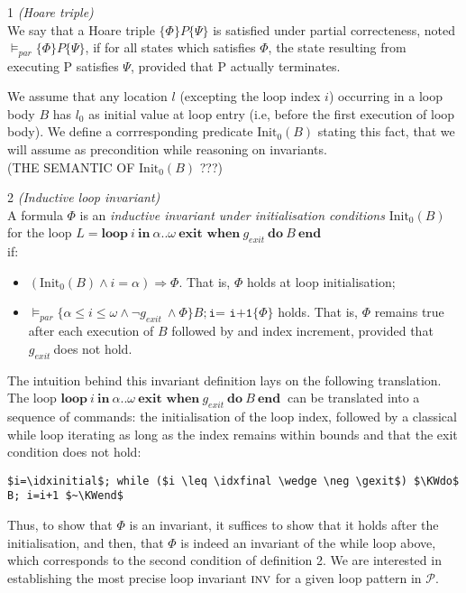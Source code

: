 \documentclass[a4paper,10pt]{article}
\newcommand{\prog}{\ensuremath{\mathcal{P}}\xspace}
\newcommand{\idx}{\ensuremath{i}\xspace}
\newcommand{\idxinitial}{\ensuremath{\alpha}\xspace}
\newcommand{\idxfinal}{\ensuremath{\omega}\xspace}
\newcommand{\Init}{\ensuremath{\mathrm{Init_{0}}}}
\newcommand{\KWloop}{\ensuremath{\mathrm{\textbf{loop}}~}}
\newcommand{\KWdo}{\ensuremath{\mathrm{\textbf{do}}~}}
\newcommand{\KWend}{\ensuremath{\mathrm{\textbf{end}}~}}
\newcommand{\KWin}{\ensuremath{~\mathrm{\textbf{in}}~}}
\newcommand{\KWexit}{\ensuremath{\mathrm{\textbf{exit when}}~}}
\newcommand{\gexit}{\ensuremath{\mathit{g_{exit}~}}}
\newcommand{\inv}{\ensuremath{\textsc{inv}}\xspace}
\newenvironment{definition}[1][Definition]{\begin{trivlist}
\item[\hskip \labelsep {\bfseries #1}]}{\end{trivlist}}
\begin{document}
\begin{definition} 1 \emph{(Hoare triple)}\\
We say that a Hoare triple $\{\Phi\} P \{ \Psi \}$ is satisfied under partial correcteness, 
noted $\vDash_{par} \{\Phi\} P \{ \Psi \}$, if for all states which satisfies $\Phi$, 
the state resulting from executing P satisfies $\Psi$, provided that P actually terminates.
\end{definition}

We assume that any location $l$ (excepting the loop index \idx) occurring in  a loop body $B$ 
has $l_0$ as initial value at loop entry (i.e, before the first execution of loop body). 
We define a corrresponding predicate $\Init(B)$ stating this fact, 
that we will assume as precondition while reasoning on invariants.\\
(THE SEMANTIC OF $\Init(B)$ ???)

\begin{definition} 2 \emph {(Inductive loop invariant)}\\
A formula $\Phi$ is an \textit{inductive invariant under
initialisation conditions} $\Init(B)$ for the loop 
\hspace{1cm} $L = \KWloop  \idx \KWin \idxinitial ..\idxfinal ~ \KWexit \gexit \KWdo B ~\KWend$ \\
if: 
\begin{itemize}
\item $(\mathrm{Init}_0(B)  \wedge i=\idxinitial) \Rightarrow \Phi$. 
      That is, $\Phi$ holds at loop initialisation;
\item $\vDash_{par} \{\idxinitial \leq i \leq \idxfinal \wedge \neg \gexit \wedge\Phi \} B;
      \texttt{i= i+1} \{ \Phi \}$ holds. That is, $\Phi$ remains true after each 
      execution of $B$ followed by and index increment,  provided that \gexit does not hold.
\end{itemize}
\end{definition}

The intuition behind this invariant definition lays on the following translation.
The loop $\KWloop  \idx \KWin \idxinitial ..\idxfinal ~ \KWexit \gexit \KWdo B ~\KWend$ 
can be translated into a sequence of commands: the initialisation of the loop index, 
followed by a classical while loop iterating as long as the index remains within bounds
and that the exit condition does not hold:
{\small
\begin{lstlisting}[mathescape]
   $i=\idxinitial$; while ($i \leq \idxfinal \wedge \neg \gexit$) $\KWdo$ B; i=i+1 $~\KWend$
\end{lstlisting}
}
Thus, to show that $\Phi$ is an invariant, it suffices to show that it holds after 
the initialisation, and then, that $\Phi$ is indeed an invariant of the while loop above, 
which corresponds to the second condition of definition 2. We are interested in establishing 
the most precise loop invariant \inv for a given loop pattern in \prog.
\end{document}
